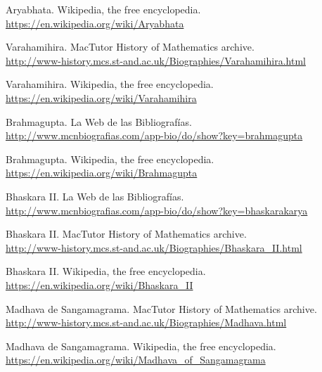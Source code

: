 \begin{thebibliography}{10}
Aryabhata. Wikipedia, the free encyclopedia.\\
  \url{https://en.wikipedia.org/wiki/Aryabhata}

Varahamihira. MacTutor History of Mathematics archive.\\
  \url{http://www-history.mcs.st-and.ac.uk/Biographies/Varahamihira.html}

Varahamihira. Wikipedia, the free encyclopedia.\\
  \url{https://en.wikipedia.org/wiki/Varahamihira}

Brahmagupta. La Web de las Bibliografías.\\
  \url{http://www.mcnbiografias.com/app-bio/do/show?key=brahmagupta}

Brahmagupta. Wikipedia, the free encyclopedia.\\
  \url{https://en.wikipedia.org/wiki/Brahmagupta}

Bhaskara II. La Web de las Bibliografías.\\
  \url{http://www.mcnbiografias.com/app-bio/do/show?key=bhaskarakarya}

Bhaskara II. MacTutor History of Mathematics archive.\\
  \url{http://www-history.mcs.st-and.ac.uk/Biographies/Bhaskara_II.html}

Bhaskara II. Wikipedia, the free encyclopedia.\\
  \url{https://en.wikipedia.org/wiki/Bhaskara_II}
  
Madhava de Sangamagrama. MacTutor History of Mathematics archive.\\
  \url{http://www-history.mcs.st-and.ac.uk/Biographies/Madhava.html}

Madhava de Sangamagrama. Wikipedia, the free encyclopedia.\\
  \url{https://en.wikipedia.org/wiki/Madhava_of_Sangamagrama}

\end{thebibliography}
